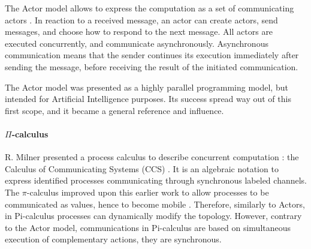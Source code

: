 The Actor model allows to express the computation as a set of communicating actors \cite{Hewitt1973a, Hewitt1977, Clinger1981}.
In reaction to a received message, an actor can create actors, send messages, and choose how to respond to the next message.
All actors are executed concurrently, and communicate asynchronously.
Asynchronous communication means that the sender continues its execution immediately after sending the message, before receiving the result of the initiated communication.

The Actor model was presented as a highly parallel programming model, but intended for Artificial Intelligence purposes.
Its success spread way out of this first scope, and it became a general reference and influence.


\paragraph{$\Pi$-calculus}

R. Milner presented a process calculus to describe concurrent computation : the Calculus of Communicating Systems (CCS) \cite{Milner1975, Milner1980}.
It is an algebraic notation to express identified processes communicating through synchronous labeled channels.
The $\pi$-calculus improved upon this earlier work to allow processes to be communicated as values, hence to become mobile \cite{Engberg1986,Milner1992a,Milner1992}.
Therefore, similarly to Actors, in Pi-calculus processes can dynamically modify the topology.
However, contrary to the Actor model, communications in Pi-calculus are based on simultaneous execution of complementary actions, they are synchronous.




